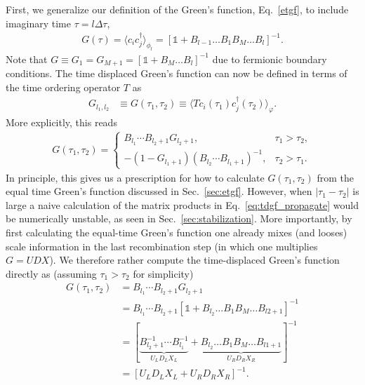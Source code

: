 \documentclass[submission, Phys]{SciPost}
\begin{document}
First, we generalize our definition of the Green's function, Eq.~\ref{etgf}, to include imaginary time $\tau = l \Delta \tau$,
\begin{align}
	G(\tau) = \langle c_{i} c_{j}^\dagger \rangle_{\phi_l} = \left[ \mathbb{1} + B_{l-1}\dots B_1 B_M \dots B_l \right]^{-1}. \label{eq:etgf_tau}
\end{align}
Note that $ G \equiv G_1 = G_{M+1} = \left[ \mathbb{1} + B_M \dots B_l \right]^{-1} $ due to fermionic boundary conditions. The time displaced Green's function can now be defined in terms of the time ordering operator $T$ as \cite{Santos2003, Assaad2002a}
\begin{align*}
	G_{l_1,l_2} &\equiv G(\tau_1, \tau_2) \equiv \langle T c_i(\tau_1) c_j^\dagger(\tau_2) \rangle_\varphi.
\end{align*}
More explicitly, this reads
\begin{align}
	G(\tau_1, \tau_2) = \begin{cases}
		B_{l_1} \cdots B_{l_2 + 1} G_{l_2 + 1}, &\tau_1 > \tau_2,\\
		- \left( 1 - G_{l_1 + 1} \right) \left( B_{l_2} \cdots B_{l_1 + 1}\right)^{-1}, &\tau_2 > \tau_1.
	\end{cases} \label{eq:tdgf_propagate}
\end{align}
In principle, this gives us a prescription for how to calculate $G(\tau_1, \tau_2)$ from the equal time Green's function discussed in Sec.~\ref{sec:etgf}. However, when $|\tau_1 - \tau_2|$ is large a naive calculation of the matrix products in Eq.~\ref{eq:tdgf_propagate} would be numerically unstable, as seen in Sec.~\ref{sec:stabilization}. More importantly, by first calculating the equal-time Green's function one already mixes (and looses) scale information in the last recombination step (in which one multiplies ${G = UDX}$). We therefore rather compute the time-displaced Green's function directly as (assuming $\tau_1>\tau_2$ for simplicity)
\begin{align}
	G(\tau_1, \tau_2) &= B_{l_1} \cdots B_{l_2 + 1} G_{l_2 + 1}\\
	&= B_{l_1} \cdots B_{l_2 + 1} \left[ \mathbb{1} + B_{l_2}\dots B_1 B_M \dots B_{l2+1} \right]^{-1}\\
	&= \left[\underbrace{B_{l_2+1}^{-1} \cdots B_{l_1}^{-1}}_{U_LD_LX_L} + \underbrace{B_{l_2}\dots B_1 B_M \dots B_{l1+1}}_{U_RD_RX_R}\right]^{-1} \\
	&= \left[U_L D_L X_L + U_R D_R X_R\right]^{-1}.
\end{align}
\end{document}
